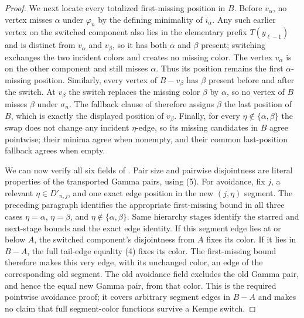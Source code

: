 \begin{proof}
We next locate every totalized first-missing position in $B$.  Before
$v_\alpha$, no vertex misses $\alpha$ under $\varphi_n$ by the defining
minimality of $i_\alpha$.  Any such earlier vertex on the switched
component also lies in the elementary prefix $T(y_{\ell-1})$ and is
distinct from $v_\alpha$ and $v_\beta$, so it has both $\alpha$ and
$\beta$ present; switching exchanges the two incident colors and creates
no missing color.  The vertex $v_\alpha$ is on the other component and
still misses $\alpha$.  Thus its position remains the first
$\alpha$-missing position.  Similarly, every vertex of $B-v_\beta$
has $\beta$ present before and after the switch.  At $v_\beta$ the
switch replaces the missing color $\beta$ by $\alpha$, so no vertex of
$B$ misses $\beta$ under $\sigma_n$.  The fallback clause of
 therefore assigns $\beta$ the
last position of $B$, which is exactly the displayed position of
$v_\beta$.  Finally, for every $\eta\notin\{\alpha,\beta\}$ the swap
does not change any incident $\eta$-edge, so its missing candidates in
$B$ agree pointwise; their minima agree when nonempty, and their common
last-position fallback agrees when empty.

We can now verify all six fields of .  Pair size
and pairwise disjointness are literal properties of the transported
Gamma pairs, using (5).  For avoidance, fix $j$, a relevant
$\eta\in D'_{n,j}$, and one exact edge position in the new
$(j,\eta)$ segment.  The preceding paragraph identifies the appropriate
first-missing bound in all three cases $\eta=\alpha$, $\eta=\beta$, and
$\eta\notin\{\alpha,\beta\}$.  Same hierarchy stages identify the starred
and next-stage bounds and the exact edge identity.  If this segment edge
lies at or below $A$, the switched component's disjointness from $A$
fixes its color.  If it lies in $B-A$, the full tail-edge equality (4)
fixes its color.  The first-missing bound therefore makes this very edge,
with its unchanged color, an edge of the corresponding old segment.
The old avoidance field excludes the old Gamma pair, and hence the equal
new Gamma pair, from that color.  This is the required pointwise
avoidance proof; it covers arbitrary segment edges in $B-A$ and makes no
claim that full segment-color functions survive a Kempe switch.


\end{proof}
